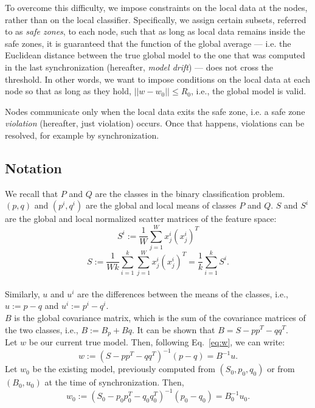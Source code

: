 \par To overcome this difficulty, we impose constraints on the local data at the nodes, rather than on the 
local classifier. Specifically, we assign certain subsets, referred to as \textit{safe zones}, to each node,
such that as long as local data remains inside the safe zones, it is guaranteed that the function of the global average ---  i.e. the Euclidean distance between the true global model to the one that was computed in the last synchronization (hereafter, \emph{model drift}) --- does not cross the threshold.
In other words, we want to impose conditions on the local
data at each node so that as long as they hold, $||w-w_0|| \leq R_0$, i.e., the global model is valid.

Nodes communicate only when the local data exits the
safe zone, i.e.  a safe zone \textit{violation} (hereafter, just
violation) occurs. Once that happens, violations can be resolved,
for example by synchronization.


\subsection{Notation}
\noindent
We recall that $P$ and $Q$ are the classes in the binary classification problem.
 $(p,q)$ and $(p^i,q^i)$  are the global and local means of classes $P$ and $Q$.
$S$ and $S^i$  are the global and local normalized scatter matrices of the feature space:
\begin{equation*}
S^i := \frac{1}{W}\sum_{j=1}^{W}x^i_j(x^i_j)^T
\end{equation*}
\begin{equation*}
S := \frac{1}{Wk}
\sum_{i=1}^k\sum_{j=1}^Wx^i_j(x^i_j)^T=\frac{1}{k}\sum_{i=1}^kS^i.
\end{equation*}
\\Similarly, $u$ and $u^i$ are the differences between the means of the classes, i.e., $u:=p - q$ and $u^i:=p^i - q^i$.
\\ $B$ is the global covariance matrix, which is the sum of the covariance matrices of the two classes, i.e., $B:=B_p+Bq$.
It can be shown that $B=S - pp^T - qq^T$.
\\Let $w$ be our current true model. Then, following Eq.~\ref{eq:w}, we can write:
\begin{equation}
w:=(S - pp^T - qq^T)^{-1}(p-q)=B^{-1}u.
\end{equation}
Let $w_0$ be the existing model, previously computed from $(S_0, p_0, q_0)$
or from $(B_0,u_0)$ at the time of synchronization.
Then,
\begin{equation}
w_0:=(S_0 - p_0p_0^T - q_0q_0^T)^{-1}(p_0-q_0)=B_0^{-1}u_0.
\end{equation}

